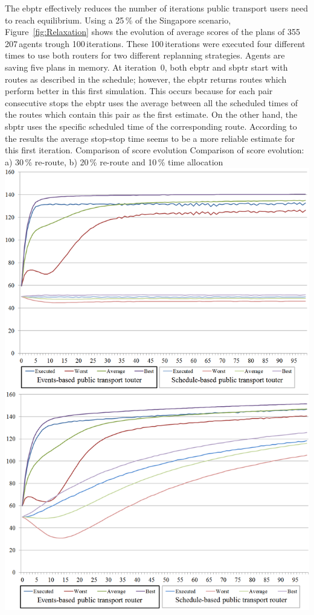 The \gls{ebptr} effectively reduces the number of iterations public transport users need to reach equilibrium. Using a 25\,\% of the Singapore scenario, Figure~\ref{fig:Relaxation} shows the evolution of average scores of the plans of 355\,207\,agents trough 100\,iterations. These 100\,iterations were executed four different times to use both routers for two different replanning strategies. Agents are saving five plans in memory. At iteration~0, both \gls{ebptr} and \gls{sbptr} start with routes as described in the schedule; however, the \gls{ebptr} returns routes which perform better in this first simulation. This occurs because for each pair consecutive stops the \gls{ebptr} uses the average between all the scheduled times of the routes which contain this pair as the first estimate. On the other hand, the \gls{sbptr} uses the specific scheduled time of the corresponding route. According to the results the average stop-stop time seems to be a more reliable estimate for this first iteration.
\createfigure
{Comparison of score evolution}
{Comparison of score evolution: a) 30\,\% re-route, b) 20\,\% re-route and 10\,\% time allocation}
{\label{fig:Relaxation}}
{\includegraphics[width=1.0\textwidth]{extending/figures/ebr/Relaxation.png}}
{}


